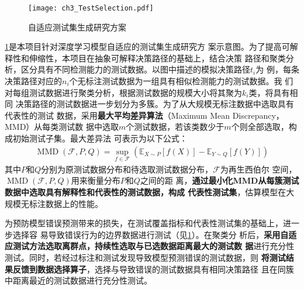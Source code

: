 

\begin{figure}[htp]
    \begin{small}
        \begin{center}
            \texttt{[image: ch3\_TestSelection.pdf]}
        \end{center}
        \caption{自适应测试集生成研究方案}
        \label{fig:ch3:interpretability}
    \end{small}
\end{figure}

\cref{fig:ch3:interpretability}是本项目针对深度学习模型自适应的测试集生成研究方
案示意图。为了提高可解释性和伸缩性，本项目在抽象可解释决策路径的基础上，结合决策
路径和聚类分析，区分具有不同检测能力的测试数据。以图中描述的模拟决策路径$t_i$为
例，每条决策路径对应的$n_i$个无标注测试数据为一组具有相似检测能力的测试数据。我
们对每组测试数据进行聚类分析，根据测试数据的规模大小将其聚为$k_i$类，将具有相同
决策路径的测试数据进一步划分为多簇。为了从大规模无标注数据中选取具有代表性的测试
数据，采用\textbf{最大平均差异算法}（Maximum Mean Discrepancy，MMD）从每类测试数
据中选取$m$个测试数据，若该类数少于$m$个则全部选取，构成初始测试子集。最大差异法
可表示为以下公式：
\begin{equation}
    \begin{aligned}
        \operatorname{MMD}(\mathcal{F}, P, Q)=\sup _{f \in \mathcal{F}}\left(\mathbb{E}_{X \sim P}[f(X)]-\mathbb{E}_{Y \sim Q}[f(Y)]\right)
    \end{aligned}
\end{equation}
其中$P$和$Q$分别为原测试数据分布和待选取测试数据分布，$\mathcal{F}$为再生西伯尔
空间，$\operatorname{MMD}(\mathcal{F}, P, Q)$用来衡量分布$P$和$Q$之间的距
离，\textbf{通过最小化MMD从每簇测试数据中选取具有解释性和代表性的测试数据，构成
代表性测试集}，估算模型在大规模无标注数据上的性能。

为预防模型错误预测带来的损失，在测试覆盖指标和代表性测试集的基础上，进一步选择容
易导致错误行为的边界数据进行测试（见\cref{fig:ch3:interpretability}）。在聚类分
析后，\textbf{采用自适应测试方法选取离群点，持续性选取与已选数据距离最大的测试数
据}进行充分性测试。同时，若经过标注和测试发现导致模型预测错误的测试数据，则
\textbf{将测试结果反馈到数据选择算子}，选择与导致错误的测试数据具有相同决策路径
且在同簇中距离最近的测试数据进行充分性测试。

